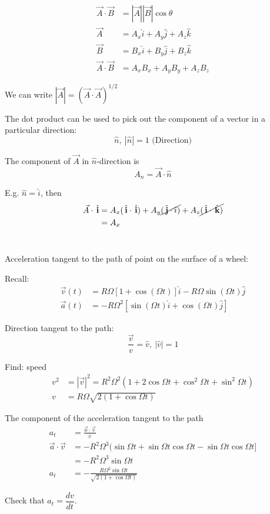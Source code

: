 \documentclass[10pt]{scrartcl}
\begin{document}
\[\begin{aligned}
\vec{A} \cdot \vec{B} &= |\vec{A}||\vec{B}|\cos \theta\\
\vec{A} &= A_x\hat{i} + A_y\hat{j} + A_z\hat{k}\\
\vec{B} &= B_x\hat{i} + B_y\hat{j} + B_z\hat{k}\\
\vec{A}\cdot \vec{B} &= A_xB_x + A_yB_y + A_zB_z
\end{aligned}
\]

We can write $|\vec{A}| = (\vec{A}\cdot\vec{A})^{1/2}$

The dot product can be used to pick out the component of a vector in a particular direction:
\[\hat{n},~|\hat{n}| = 1 \text{ (Direction)}\]

The component of $\vec{A}$ in $\hat{n}$-direction is 
\[A_n = \vec{A}\cdot\hat{n}\]

E.g. $\hat{n} = \hat{i}$, then 
\[\begin{aligned}
\vec{A}\cdot\hat{i} &= A_x(\hat{i}\cdot\hat{i}) + A_y\cancel{(\hat{j}\cdot{i})} + A_z\cancel{(\hat{i} \cdot\hat{k})}\\
&= A_x
\end{aligned}
\]~

\begin{example}
Acceleration tangent to the path of point on the surface of a wheel:

Recall:
\[
\begin{aligned}
\vec{v}(t) &= R\Omega[1 + \cos(\Omega t)]\hat{i} -R\Omega\sin(\Omega t)\hat{j}\\
\vec{a}(t) &= -R\Omega^2[\sin(\Omega t)\hat{i} + \cos(\Omega t)\hat{j}]
\end{aligned}
\]

Direction tangent to the path:
\[\frac{\vec{v}}{v} = \hat{v},~|\hat{v}| = 1\]

Find: speed
\[\begin{aligned}
v^2 &= |\vec{v}|^2 = R^2\Omega^2(1 + 2\cos\Omega t + \cos^2\Omega t + \sin^2\Omega t)\\
v &= R\Omega\sqrt{2(1 + \cos\Omega t)}
\end{aligned}\]

The component of the acceleration tangent to the path 
\[\begin{aligned}
a_t &= \frac{\vec{a}\cdot\vec{v}}{v}\\
\vec{a} \cdot \vec{v} &= -R^2\Omega^3(\sin\Omega t + \sin\Omega t \cos\Omega t - \sin\Omega t \cos \Omega t]\\
&= -R^2\Omega^3\sin\Omega t\\
a_t &= -\frac{R\Omega^2\sin\Omega t}{\sqrt{2(1 + \cos\Omega t)}}
\end{aligned}
\]


Check that $a_t = \dfrac{dv}{dt}$. 
\end{example}~
\end{document}
